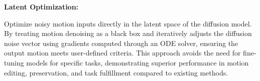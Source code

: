\textbf{Latent Optimization:}

Optimize noisy motion inputs directly in the latent space of the diffusion model. By treating motion denoising as a black box and iteratively adjusts the diffusion noise vector using gradients computed through an ODE solver, ensuring the output motion meets user-defined criteria. This approach avoids the need for fine-tuning models for specific tasks, demonstrating superior performance in motion editing, preservation, and task fulfillment compared to existing methods.